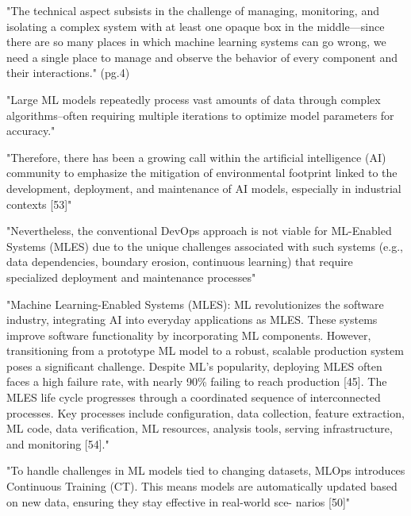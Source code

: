 "The technical aspect subsists in the challenge of managing, monitoring, and
isolating a complex system with at least one opaque box in the middle—since
there are so many places in which machine learning systems can go wrong, we need
a single place to manage and observe the behavior of every component and their
interactions." (pg.4)


\parencite{Chadli2024TheStudy}

"Large ML models repeatedly process vast amounts of data through complex
algorithms–often requiring multiple iterations to optimize model parameters
for accuracy."

"Therefore, there has been a growing call within the artificial intelligence
(AI) community to emphasize the mitigation of environmental footprint linked
to the development, deployment, and maintenance of AI models, especially in
industrial contexts [53]"

"Nevertheless, the conventional DevOps approach is not viable for ML-Enabled
Systems (MLES) due to the unique challenges associated with such systems
(e.g., data dependencies, boundary erosion, continuous learning) that require
specialized deployment and maintenance processes"

"Machine Learning-Enabled Systems (MLES): ML revolutionizes the software
industry, integrating AI into everyday applications as MLES. These systems
improve software functionality by incorporating ML components. However,
transitioning from a prototype ML model to a robust, scalable production system
poses a significant challenge. Despite ML’s popularity, deploying MLES often
faces a high failure rate, with nearly 90\% failing to reach production [45].
The MLES life cycle progresses through a coordinated sequence of interconnected
processes. Key processes include configuration, data collection, feature
extraction, ML code, data verification, ML resources, analysis tools, serving
infrastructure, and monitoring [54]."

"To handle challenges in ML models tied to changing datasets, MLOps introduces
Continuous Training (CT). This means models are automatically updated based on
new data, ensuring they stay effective in real-world sce- narios [50]"


